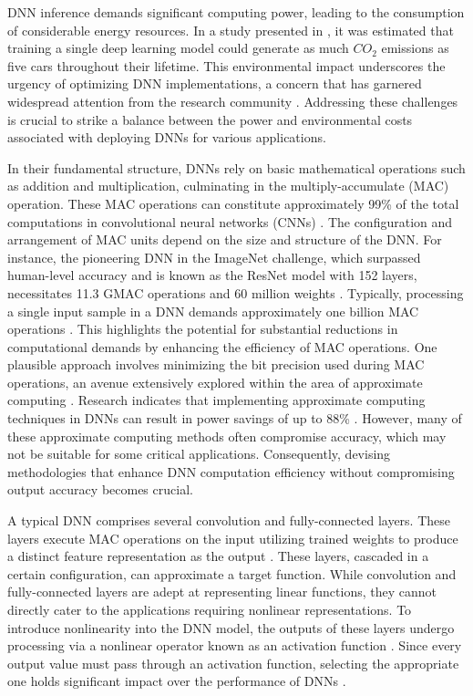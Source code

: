 \documentclass[conference]{IEEEtran}
\begin{document}
DNN inference demands significant computing power, leading to the consumption of considerable energy resources. In a study presented in \cite{strubell2019energy}, it was estimated that training a single deep learning model could generate as much $CO_2$ emissions as five cars throughout their lifetime. This environmental impact underscores the urgency of optimizing DNN implementations, a concern that has garnered widespread attention from the research community \cite{narayanan2019pipedream, deng2018permdnn}. Addressing these challenges is crucial to strike a balance between the power and environmental costs associated with deploying DNNs for various applications.

In their fundamental structure, DNNs rely on basic mathematical operations such as addition and multiplication, culminating in the multiply-accumulate (MAC) operation. These MAC operations can constitute approximately 99\% of the total computations in convolutional neural networks (CNNs) \cite{jain2018compensated}. The configuration and arrangement of MAC units depend on the size and structure of the DNN. For instance, the pioneering DNN in the ImageNet challenge, which surpassed human-level accuracy and is known as the ResNet model with 152 layers, necessitates 11.3 GMAC operations and 60 million weights \cite{deng2009imagenet, he2016deep}. Typically, processing a single input sample in a DNN demands approximately one billion MAC operations \cite{hanif2019hardware}. This highlights the potential for substantial reductions in computational demands by enhancing the efficiency of MAC operations. One plausible approach involves minimizing the bit precision used during MAC operations, an avenue extensively explored within the area of approximate computing \cite{agrawal2016approximate}. Research indicates that implementing approximate computing techniques in DNNs can result in power savings of up to 88\% \cite{liu2019energy}. However, many of these approximate computing methods often compromise accuracy, which may not be suitable for some critical applications. Consequently, devising methodologies that enhance DNN computation efficiency without compromising output accuracy becomes crucial.

A typical DNN comprises several convolution and fully-connected layers. These layers execute MAC operations on the input utilizing trained weights to produce a distinct feature representation as the output \cite{liu2017survey}. These layers, cascaded in a certain configuration, can approximate a target function. While convolution and fully-connected layers are adept at representing linear functions, they cannot directly cater to the applications requiring nonlinear representations. To introduce nonlinearity into the DNN model, the outputs of these layers undergo processing via a nonlinear operator known as an activation function \cite{nwankpa2018activation}. Since every output value must pass through an activation function, selecting the appropriate one holds significant impact over the performance of DNNs \cite{dubey2022activation}.
\end{document}
